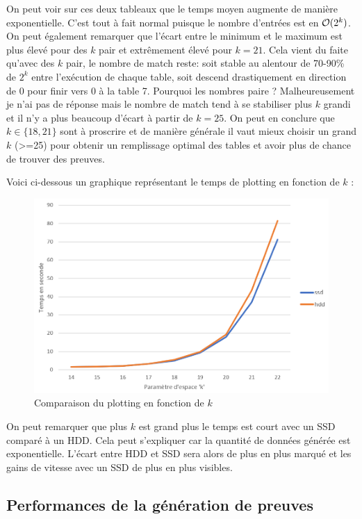 On peut voir sur ces deux tableaux que le temps moyen augmente de manière exponentielle. C'est tout à fait normal puisque le nombre d'entrées est en $\mathcal{O}(2^k)$. On peut également remarquer que l'écart entre le minimum et le maximum est plus élevé pour des $k$ pair et extrêmement élevé pour $k = 21$. Cela vient du faite qu'avec des $k$ pair, le nombre de match reste: soit stable au alentour de 70-90\% de $2^k$ entre l'exécution de chaque table, soit descend drastiquement en direction de 0 pour finir vers 0 à la table 7. Pourquoi les nombres paire ? Malheureusement je n'ai pas de réponse mais le nombre de match tend à se stabiliser plus $k$ grandi et il n'y a plus beaucoup d'écart à partir de $k = 25$. On peut en conclure que $k \in \{18,21\}$ sont à proscrire et de manière générale il vaut mieux choisir un grand $k$ (>=25) pour obtenir un remplissage optimal des tables et avoir plus de chance de trouver des preuves.

Voici ci-dessous un graphique représentant le temps de plotting en fonction de $k$ :

\begin{figure}[H]
  \centering
  \includegraphics[width=14cm]{images/bench_ssd_hdd.png}
  \caption{Comparaison du plotting en fonction de $k$}
\end{figure}

On peut remarquer que plus $k$ est grand plus le temps est court avec un SSD comparé à un HDD. Cela peut s'expliquer car la quantité de données générée est exponentielle. L'écart entre HDD et SSD sera alors de plus en plus marqué et les gains de vitesse avec un SSD de plus en plus visibles.

\subsection{Performances de la génération de preuves}

